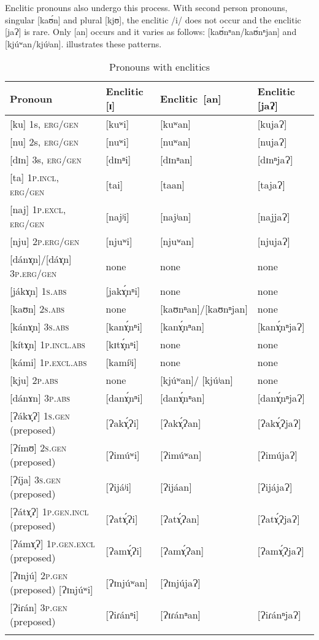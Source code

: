 Enclitic pronouns also undergo this process. With second person pronouns, singular [kaʊ́n] and plural [kjʊ], the enclitic /i/ does not occur and the enclitic [jaɁ] is rare. Only [an] occurs and it varies as follows: [kaʊ́nⁿan/kaʊ́nⁿjan] and [kjúʷan/kjúʲan].  illustrates these patterns.
\begin{table}
\caption{Pronouns with enclitics}
\label{tab2.13}
\begin{tabularx}{\textwidth}{l@{~}lQl}
\lsptoprule
Pronoun & Enclitic [ɪ] & \mbox{Enclitic [an]} & Enclitic [jaɁ] \\
\midrule
{}[ku] 1s, \textsc{erg}/\textsc{gen} & [kuʷi] & [kuʷan] & [kujaɁ] \\
\tablevspace
{}[nu] 2s, \textsc{erg}/\textsc{gen} & [nuʷi] & [nuʷan] & [nujaɁ] \\
\tablevspace
{}[dɪn] 3s, \textsc{erg}/\textsc{gen} & [dɪnⁿi] & [dɪnⁿan] & [dɪnⁿjaɁ] \\
\tablevspace
{}[ta] 1\textsc{p.incl}, \textsc{erg}/\textsc{gen} & [tai] & [taan] & [tajaɁ] \\
\tablevspace
{}[naj] 1\textsc{p.excl}, \textsc{erg}/\textsc{gen} & [najʲi] & [najʲan] & [najjaɁ] \\
\tablevspace
{}[nju] 2\textsc{p.erg/gen} & [njuʷi] & [njuʷan] & [njujaɁ] \\
\tablevspace
{}[dánɤ̞n]/[dáɤ̞n] 3\textsc{p.erg/gen} & none & none & none \\
\tablevspace
{}[jákɤ̞n] 1\textsc{s.abs} & [jakɤ̞́nⁿi] & none & none \\
\tablevspace
{}[kaʊn] 2\textsc{s.abs} & none & [kaʊnⁿan]{\slash}\mbox{[kaʊnⁿjan]} & none \\
\tablevspace
{}[kánɤ̞n] 3\textsc{s.abs} & [kanɤ̞́nⁿi] & [kanɤ̞́nⁿan] & [kanɤ̞́nⁿjaɁ] \\
\tablevspace
{}[kítɤ̞n] 1\textsc{p.incl.abs} & [kɪtɤ̞́nⁿi] & none & none \\
\tablevspace
{}[kámi] 1\textsc{p.excl.abs} & [kamíʲi] & none & none \\
\tablevspace
{}[kju] 2\textsc{p.abs} & none & [kjúʷan]/ [kjúʲan] & none \\
\tablevspace
{}[dánɤn] 3\textsc{p.abs} & [danɤ̞́nⁿi] & [danɤ̞́nⁿan] & [danɤ̞́nⁿjaɁ] \\
\tablevspace
{}[Ɂákɤ̞Ɂ] 1\textsc{s.gen} (preposed) & [Ɂakɤ̞́Ɂi] & [Ɂakɤ̞́Ɂan] & [Ɂakɤ̞́ɁjaɁ] \\
\tablevspace
{}[Ɂímʊ] 2\textsc{s.gen} (preposed) & [Ɂimúʷi] & [Ɂimúʷan] & [ɁimújaɁ] \\
\tablevspace
{}[Ɂíja] 3\textsc{s.gen} (preposed) & [Ɂijáʲi] & [Ɂijáan] & [ɁijájaɁ] \\
\tablevspace
{}[Ɂátɤ̞Ɂ] 1\textsc{p.gen.incl} (preposed) & [Ɂatɤ̞́Ɂi] & [Ɂatɤ̞́Ɂan] & [Ɂatɤ̞́ɁjaɁ] \\
\tablevspace
{}[Ɂámɤ̞Ɂ] 1\textsc{p.gen.excl} (preposed) & [Ɂamɤ̞́Ɂi] & [Ɂamɤ̞́Ɂan] & [Ɂamɤ̞́ɁjaɁ] \\
\tablevspace
{}[Ɂɪnjú] 2\textsc{p.gen} (preposed) [Ɂɪnjúʷi] & [Ɂɪnjúʷan] & [ɁɪnjújaɁ] \\
\tablevspace
{}[Ɂiɾán] 3\textsc{p.gen} (preposed) & [Ɂiɾánⁿi] & [Ɂɪɾánⁿan] & [ɁiɾánⁿjaɁ] \\
\lspbottomrule
\end{tabularx}
\end{table}
